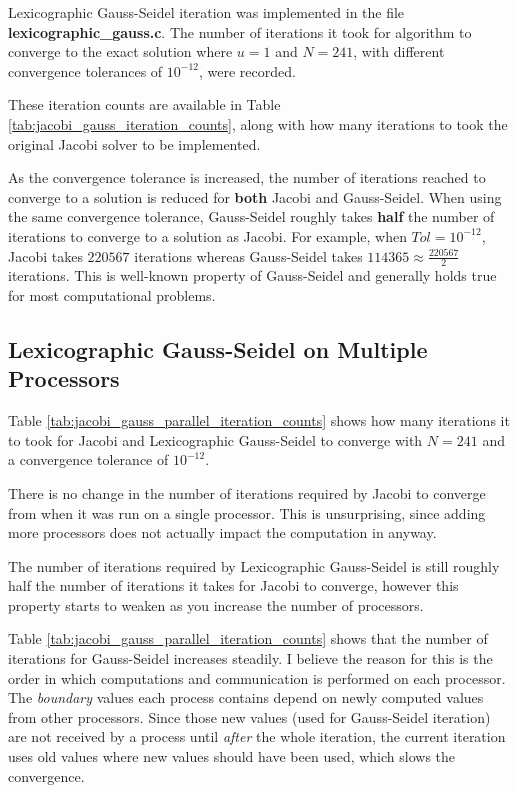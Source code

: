 \documentclass{article}
\begin{document}
Lexicographic Gauss-Seidel iteration was implemented in the file \textbf{lexicographic\_gauss.c}. The number of iterations it took for algorithm to converge to the exact solution where $u = 1$ and $N = 241$, with different convergence tolerances of $10^{-12}$, were recorded.

These iteration counts are available in Table \ref{tab:jacobi_gauss_iteration_counts}, along with how many iterations to took the original Jacobi solver to be implemented.

As the convergence tolerance is increased, the number of iterations reached to converge to a solution is reduced for \textbf{both} Jacobi and Gauss-Seidel. When using the same convergence tolerance, Gauss-Seidel roughly takes \textbf{half} the number of iterations to converge to a solution as Jacobi. For example, when $Tol = 10^{-12}$, Jacobi takes $220567$ iterations whereas Gauss-Seidel takes $114365 \approx \frac{220567}{2}$ iterations. This is well-known property of Gauss-Seidel and generally holds true for most computational problems.

\subsection{Lexicographic Gauss-Seidel on Multiple Processors}

Table \ref{tab:jacobi_gauss_parallel_iteration_counts} shows how many iterations it to took for Jacobi and Lexicographic Gauss-Seidel to converge with $N = 241$ and a convergence tolerance of $10^{-12}$.

There is no change in the number of iterations required by Jacobi to converge from when it was run on a single processor. This is unsurprising, since adding more processors does not actually impact the computation in anyway.

The number of iterations required by Lexicographic Gauss-Seidel is still roughly half the number of iterations it takes for Jacobi to converge, however this property starts to weaken as you increase the number of processors.

Table \ref{tab:jacobi_gauss_parallel_iteration_counts} shows that the number of iterations for Gauss-Seidel increases steadily. I believe the reason for this is the order in which computations and communication is performed on each processor. The \textit{boundary} values each process contains depend on newly computed values from other processors. Since those new values (used for Gauss-Seidel iteration) are not received by a process until \textit{after} the whole iteration, the current iteration uses old values where new values should have been used, which slows the convergence.
\end{document}
